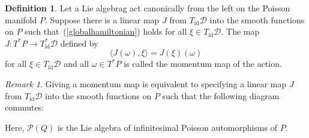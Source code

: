 \documentclass[a5paper,10pt,twoside]{article}
\newcommand{\cD}{\ensuremath{\mathcal{D}}}
\DeclareMathOperator*{\id}{id}
\theoremstyle{plain}
\theoremstyle{definition}
\newtheorem{defn}[teo]{Definition}
\theoremstyle{remark}
\newtheorem{rem}[teo]{Remark}
\begin{document}
\begin{defn}
Let a  Lie algebrag act canonically from the left on the Poisson manifold $P.$ Suppose there is a linear map $J$ from $T_{\id}\cD$ into the smooth functions on $P$ such that~(\ref{globalhamiltonian}) holds for all $\xi\in T_{\id}\cD$. The map $J:T^*P\to T_{\id}^*\cD$ defined by
\[
\langle J(\omega),\xi\rangle=J(\xi)(\omega)
\]
for all $\xi \in T_{\id}\cD$ and all $\omega\in T^*P$ is called the momentum map of the action.
\end{defn}

\begin{rem}
Giving a momentum map is equivalent to specifying a linear map $J$ from $T_{\id}\cD$ into the smooth functions on $P$ such that the following diagram commutes:
\begin{center}
\end{center}
%
Here, $ \mathcal{P}(Q)$ is the Lie algebra of infinitesimal Poisson automorphisms of $P$.
\end{rem}
\end{document}
